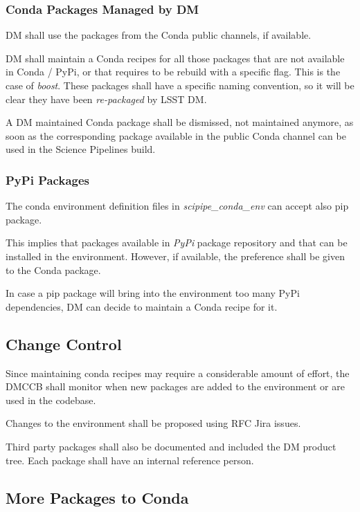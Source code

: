 \subsubsection{Conda Packages Managed by DM} \label{sec:3rddmpkgs}

DM shall use the packages from the Conda public channels, if available.

DM shall maintain a Conda recipes for all those packages that are not available in Conda / PyPi, or that requires to be rebuild with a specific flag. This is the case of \textit{boost}.
These packages shall have a specific naming convention, so it will be clear they have been \textit{re-packaged} by LSST DM.

A DM maintained Conda package shall be dismissed, not maintained anymore, as soon as the corresponding package available in the public Conda channel can be used in the Science Pipelines build.


\subsubsection{PyPi Packages} \label{sec:pypi}

The conda environment definition files in \textit{scipipe\_conda\_env} can accept also pip package. 

This implies that packages available in \textit{PyPi} package repository and that can be installed in the environment. 
However, if available, the preference shall be given to the Conda package.

In case a pip package will bring into the environment too many PyPi dependencies, DM can decide to maintain a Conda recipe for it.


\subsection{Change Control}

Since maintaining conda recipes may require a considerable amount of effort, the DMCCB shall monitor when new packages are added to the environment or are used in the codebase.

Changes to the environment shall be proposed using RFC Jira issues.

Third party packages shall also be documented and included the DM product tree. 
Each package shall have an internal reference person.


\subsection{More Packages to Conda}

